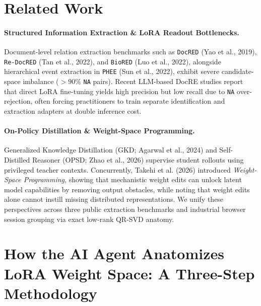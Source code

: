 \documentclass[11pt,a4paper]{article}
\begin{document}
\section{Related Work}
\paragraph{Structured Information Extraction \& LoRA Readout Bottlenecks.} Document-level relation extraction benchmarks such as \texttt{DocRED} (Yao et al., 2019), \texttt{Re-DocRED} (Tan et al., 2022), and \texttt{BioRED} (Luo et al., 2022), alongside hierarchical event extraction in \texttt{PHEE} (Sun et al., 2022), exhibit severe candidate-space imbalance ($>90\%$ \texttt{NA} pairs). Recent LLM-based DocRE studies report that direct LoRA fine-tuning yields high precision but low recall due to \texttt{NA} over-rejection, often forcing practitioners to train separate identification and extraction adapters at double inference cost.
\paragraph{On-Policy Distillation \& Weight-Space Programming.} Generalized Knowledge Distillation (GKD; Agarwal et al., 2024) and Self-Distilled Reasoner (OPSD; Zhao et al., 2026) supervise student rollouts using privileged teacher contexts. Concurrently, Takehi et al. (2026) introduced \emph{Weight-Space Programming}, showing that mechanistic weight edits can unlock latent model capabilities by removing output obstacles, while noting that weight edits alone cannot instill missing distributed representations. We unify these perspectives across three public extraction benchmarks and industrial browser session grouping via exact low-rank QR-SVD anatomy.

\section{How the AI Agent Anatomizes LoRA Weight Space: A Three-Step Methodology}
\end{document}
